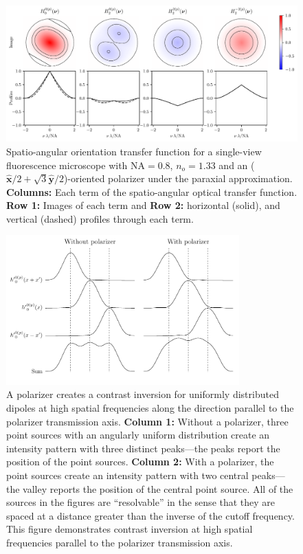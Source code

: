 \documentclass[11pt]{article}
\providecommand{\mh}[1]{\mathbf{\hat{#1}}}
\begin{document}
\begin{figure}[H]
 \captionsetup{width=1.0\linewidth}
 \centering
   \centering
   \includegraphics[width = 1.\textwidth]{../calculations/otfs3.pdf}
   \caption{Spatio-angular orientation transfer function for a single-view
     fluorescence microscope with $\text{NA}=0.8$, $n_o=1.33$ and an
     ($\mh{x}/2 + \sqrt{3}\mh{y}/2$)-oriented polarizer under the paraxial
     approximation. \textbf{Columns:} Each term of the spatio-angular optical
     transfer function. \textbf{Row 1:} Images of each term and \textbf{Row 2:}
     horizontal (solid), and vertical (dashed) profiles through each term.}
   \label{fig:otf2}
\end{figure}

\begin{figure}[H]
 \captionsetup{width=1.0\linewidth}
 \centering
   \centering
   \includegraphics[width = 0.8\textwidth]{../calculations/psf-min.pdf}
   \caption{A polarizer creates a contrast inversion for uniformly distributed
     dipoles at high spatial frequencies along the direction parallel to the
     polarizer transmission axis. \textbf{Column 1:} Without a polarizer, three
     point sources with an angularly uniform distribution create an intensity
     pattern with three distinct peaks---the peaks report the position of the
     point sources. \textbf{Column 2:} With a polarizer, the point sources
     create an intensity pattern with two central peaks---the valley reports the
     position of the central point source. All of the sources in the figures are
     ``resolvable'' in the sense that they are spaced at a distance greater than
     the inverse of the cutoff frequency. This figure demonstrates contrast
     inversion at high spatial frequencies parallel to the polarizer
     transmission axis. }
   \label{fig:psfmin}
\end{figure}
\end{document}
